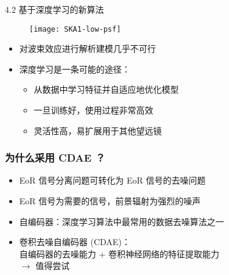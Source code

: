\documentclass{beamer}
\begin{document}
\begin{frame}{4.2 基于深度学习的新算法}
  \begin{figure}
    \centering
    \texttt{[image: SKA1-low-psf]}
  \end{figure}

  \begin{itemize}
    \item 对波束效应进行解析建模几乎不可行
    \item \alert{深度学习}是一条可能的途径：
      \begin{itemize}
        \item 从数据中学习特征并自适应地优化模型
        \item 一旦训练好，使用过程非常高效
        \item 灵活性高，易扩展用于其他望远镜
      \end{itemize}
  \end{itemize}
\end{frame}

\begin{frame}[subsec]
  \frametitle{为什么采用 CDAE ？}
  \begin{itemize}
    \item EoR 信号分离问题可转化为 EoR 信号的\alert{去噪问题}
    \item EoR 信号为需要的信号，前景辐射为强烈的噪声
    \item \alert{自编码器}：深度学习算法中最常用的数据去噪算法之一
    \item \alert{卷积去噪自编码器 (CDAE)}： \\
      自编码器的去噪能力 + 卷积神经网络的特征提取能力 \\
      $\rightarrow$ 值得尝试
  \end{itemize}
\end{frame}
\end{document}
